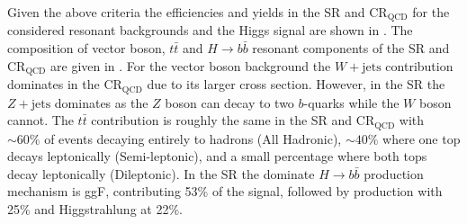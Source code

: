 Given the above criteria the efficiencies and yields in the SR and
$\text{CR}_{\text{QCD}}$ for the considered resonant backgrounds and the Higgs
signal are shown in . The composition of vector boson, $t\bar{t}$ and $H
\rightarrow b\bar{b}$ resonant components of the SR and
$\text{CR}_{\text{QCD}}$ are given in . For the vector boson background
the $W+\text{jets}$ contribution dominates in the $\text{CR}_{\text{QCD}}$ due to its
larger cross section.  However, in the SR the $Z+\text{jets}$ dominates as the $Z$
boson can decay to two $b$-quarks while the $W$ boson cannot.  The $t\bar{t}$
contribution is roughly the same in the SR and $\text{CR}_{\text{QCD}}$ with
$\sim 60\%$ of events decaying entirely to hadrons (All Hadronic), $\sim 40\%$
where one top decays leptonically (Semi-leptonic), and a small percentage where
both tops decay leptonically (Dileptonic). In the SR the dominate $H
\rightarrow b\bar{b}$ production mechanism is ggF, contributing 53\% of the
signal, followed by production with 25\% and Higgstrahlung at 22\%. 

